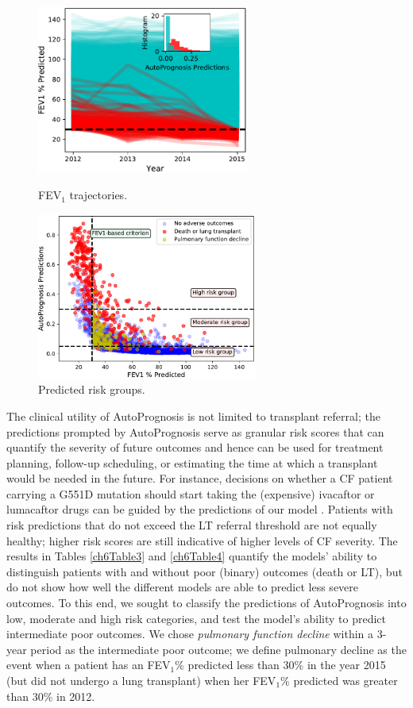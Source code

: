 \documentclass [PhD] {uclathes}
\begin{document}
\begin{figure}[!htbp] %
\begin{minipage}[b]{0.45\linewidth}
\centering
\includegraphics[width=2.75in]{ch6Fig3.pdf}
\caption{FEV$_1$ trajectories.}
\label{ch6fig3}
\end{minipage}%
\begin{minipage}[b]{0.45\linewidth}
\centering
\includegraphics[width=2.85in]{ch6Fig4.pdf}
\caption{Predicted risk groups.}
\label{ch6fig4}
\end{minipage}
\end{figure}

The clinical utility of AutoPrognosis is not limited to transplant referral; the predictions prompted by AutoPrognosis serve as granular risk scores that can quantify the severity of future outcomes and hence can be used for treatment planning, follow-up scheduling, or estimating the time at which a transplant would be needed in the future. For instance, decisions on whether a CF patient carrying a G551D mutation should start taking the (expensive) ivacaftor or lumacaftor drugs can be guided by the predictions of our model \cite{rowe2014clinical,wainwright2015lumacaftor}. Patients with risk predictions that do not exceed the LT referral threshold are not equally healthy; higher risk scores are still indicative of higher levels of CF severity. The results in Tables \ref{ch6Table3} and \ref{ch6Table4} quantify the models' ability to distinguish patients with and without poor (binary) outcomes (death or LT), but do not show how well the different models are able to predict less severe outcomes. To this end, we sought to classify the predictions of AutoPrognosis into low, moderate and high risk categories, and test the model's ability to predict intermediate poor outcomes. We chose {\it pulmonary function decline} within a 3-year period as the intermediate poor outcome; we define pulmonary decline as the event when a patient has an FEV$_1 \%$ predicted less than 30$\%$ in the year 2015 (but did not undergo a lung transplant) when her FEV$_1 \%$ predicted was greater than 30$\%$ in 2012.   
\end{document}
